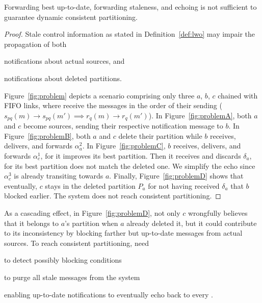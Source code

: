 
\begin{lemma} Forwarding best up-to-date,
  forwarding staleness, and echoing is not sufficient to guarantee
  dynamic consistent partitioning.
\end{lemma}

\begin{proof}
Stale control information as stated in Definition~\ref{def:lwo} may
impair the propagation of both
\begin{inparaenum}[(i)]
\item notifications about actual sources, and
\item notifications about deleted partitions.
\end{inparaenum}
Figure~\ref{fig:problem} depicts a scenario comprising only three
\processes $a$, $b$, $c$ chained with FIFO links, \ie where \processes
receive the messages in the order of their sending ($s_{pq}(m)
\rightarrow s_{pq}(m') \implies r_q(m) \rightarrow r_q(m')$). In
Figure~\ref{fig:problemA}, both $a$ and $c$ become sources, sending
their respective notification message to $b$. In
Figure~\ref{fig:problemB}, both $a$ and $c$ delete their partition
while $b$ receives, delivers, and forwards $\alpha_a^2$. In
Figure~\ref{fig:problemC}, $b$ receives, delivers, and forwards
$\alpha_c^1$, for it improves its best partition. Then it receives and
discards $\delta_a$, for its best partition does not match the deleted
one. We simplify the echo since $\alpha_c^3$ is already transiting
towards $a$. Finally, Figure~\ref{fig:problemD} shows that eventually,
$c$ stays in the deleted partition $P_a$ for not having received
$\delta_a$ that $b$ blocked earlier. The system does not reach
consistent partitioning. \end{proof}

As a cascading effect, in Figure~\ref{fig:problemD}, not only $c$
wrongfully believes that it belongs to $a$'s partition when $a$
already deleted it, but it could contribute to its inconsistency by
blocking farther but up-to-date messages from actual sources. To reach
consistent partitioning, \processes need
\begin{inparaenum}[(i)]
\item to detect possibly blocking conditions 
\item to purge all stale messages from the system
\item enabling up-to-date notifications to eventually echo back to
  every \process.
\end{inparaenum}

